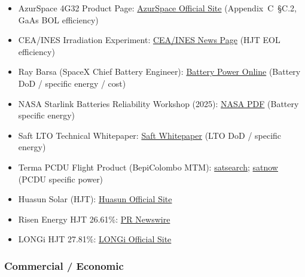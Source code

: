 \begin{itemize}
  \item AzurSpace 4G32 Product Page: \href{https://www.azurspace.com/en/products/space-products/}{AzurSpace Official Site} (Appendix~C~\S C.2, GaAs BOL efficiency)
  \item CEA/INES Irradiation Experiment: \href{https://www.cea.fr/cea-tech/liten/english/Pages/Medias/News/2025/major-breakthrough-for-photovoltaic-technology-space.aspx}{CEA/INES News Page} (HJT EOL efficiency)
  \item Ray Barsa (SpaceX Chief Battery Engineer): \href{https://ciclibattery.com/battery-power-online-space-batteries-how-spacex-designs-batteries-for-satellites/}{Battery Power Online} (Battery DoD / specific energy / cost)
  \item NASA Starlink Batteries Reliability Workshop (2025): \href{https://www.nasa.gov/wp-content/uploads/2024/01/starlink-batteries-reliability-lessons-from-10000-leo-satellites-abw-2025.pdf}{NASA PDF} (Battery specific energy)
  \item Saft LTO Technical Whitepaper: \href{https://saft.com/en/horizon-new-lithium-based-technology-satellite-batteries-improving-mission-performance}{Saft Whitepaper} (LTO DoD / specific energy)
  \item Terma PCDU Flight Product (BepiColombo MTM): \href{https://satsearch.co/products/terma-power-conditioning-distribution-unit}{satsearch}; \href{https://www.satnow.com/products/power-conditioning-and-distribution-units/terma/134-1195-bepicolombo-mtm-pcdu}{satnow} (PCDU specific power)
  \item Huasun Solar (HJT): \href{https://www.huasunsolar.com/}{Huasun Official Site}
  \item Risen Energy HJT 26.61\%: \href{https://www.prnewswire.com/news-releases/risen-energy-achieves-26-61-efficiency-for-hjt-solar-cell-302390000.html}{PR Newswire}
  \item LONGi HJT 27.81\%: \href{https://www.longi.com/}{LONGi Official Site}
\end{itemize}

\subsubsection{Commercial / Economic}

